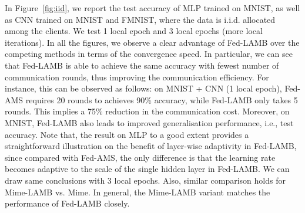 \documentclass[nohyperref]{article}
\theoremstyle{plain}
\theoremstyle{definition}
\theoremstyle{remark}
\begin{document}
In Figure~\ref{fig:iid}, we report the test accuracy of MLP trained on MNIST, as well as CNN trained on MNIST and FMNIST, where the data is i.i.d. allocated among the clients. We test 1 local epoch and 3 local epochs (more local iterations). In all the figures, we observe a clear advantage of Fed-LAMB over the competing methods in terms of the convergence speed. In particular, we can see that Fed-LAMB is able to achieve the same accuracy with fewest number of communication rounds, thus improving the communication efficiency. For instance, this can be observed as follows: on MNIST + CNN (1 local epoch), Fed-AMS requires 20 rounds to achieves 90\% accuracy, while Fed-LAMB only takes 5 rounds. This implies a 75\% reduction in the communication cost. Moreover, on MNIST, Fed-LAMB also leads to improved generalisation performance, i.e., test accuracy. Note that, the result on MLP to a good extent provides a straightforward illustration on the benefit of layer-wise adaptivity in Fed-LAMB, since compared with Fed-AMS, the only difference is that the learning rate becomes adaptive to the scale of the single hidden layer in Fed-LAMB. We can draw same conclusions with 3 local epochs. Also, similar comparison holds for Mime-LAMB vs. Mime. In general, the Mime-LAMB variant matches the performance of Fed-LAMB closely. 
\end{document}
